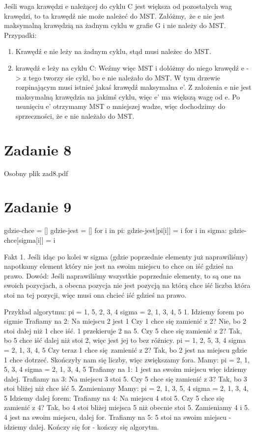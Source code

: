 \documentclass[12pt]{article}
\begin{document}
Jeśli waga krawędzi e należącej do cyklu C jest większa od pozostałych wag krawędzi, to ta krawędź nie może należeć do MST. Załóżmy, że e nie jest maksymalną krawędzią na żadnym cyklu w grafie G i nie należy do MST. Przypadki:
\begin{enumerate}
    \item Krawędź e nie leży na żadnym cyklu, stąd musi należec do MST.
    \item krawędź e leży na cyklu C: Weźmy więc MST i dołóżmy do niego krawędź e -> z tego tworzy sie cykl, bo e nie należało do MST. W tym drzewie rozpinającym musi istnieć jakaś krawędź maksymalna e'. Z założenia e nie jest maksymalną krawędzia na jakimś cyklu, więc e' ma większą wagę od e. Po usunięciu e' otrzymamy MST o mniejszej wadze, więc dochodzimy do sprzeczności, że e nie należało do MST.
\end{enumerate}
\section{Zadanie 8} 

Osobny plik zad8.pdf

\section{Zadanie 9}

gdzie-chce = []
gdzie-jest = []
for i in pi:
    gdzie-jest[pi[i]] = i
for i in sigma:
    gdzie-chce[sigma[i]] = i 


Fakt 1.
Jeśli idąc po kolei w sigma (gdzie poprzednie elementy już naprawiliśmy) napotkamy element który nie jest na swoim miejscu to chce on iść gdzieś na prawo.
Dowód:
Jeśli naprawiliśmy wszystkie poprzednie elementy, to są one na swoich pozycjach, a obecna pozycja nie jest pozycją na którą chce iść liczba która stoi na tej pozycji, więc musi ona chcieć iść gdzieś na prawo.

Przykład algorytmu:
pi = {1, 5, 2, 3, 4}
sigma = {2, 1, 3, 4, 5}
1. Idziemy forem po sigmie
Trafiamy na 2:
Na miejscu 2 jest 1 
Czy 1 chce się zamienić z 2? Nie, bo 2 stoi dalej niż 1 chce iść. 
1 przekieruje 2 na 5.
Czy 5 chce się zamienić z 2? Tak, bo 5 chce iść dalej niż stoi 2, więc jest jej to bez różnicy.
pi = {1, 2, 5, 3, 4}
sigma = {2, 1, 3, 4, 5}
Czy teraz 1 chce się zamienić z 2? Tak, bo 2 jest na miejscu gdzie 1 chce dotrzeć.
Skończyły nam się liczby, więc zwiększamy fora.
Mamy:
pi = {2, 1, 5, 3, 4}
sigma = {2, 1, 3, 4, 5}
Trafiamy na 1:
1 jest na swoim miejscu więc idziemy dalej.
Trafiamy na 3:
Na miejscu 3 stoi 5.
Czy 5 chce się zamienić z 3? Tak, bo 3 stoi bliżej niż chce iść 5.
Zamieniamy
Mamy:
pi = {2, 1, 3, 5, 4}
sigma = {2, 1, 3, 4, 5}
Idziemy dalej forem:
Trafiamy na 4:
Na miejscu 4 stoi 5.
Czy 5 chce się zamienić z 4?
Tak, bo 4 stoi bliżej miejsca 5 niż obecnie stoi 5.
Zamieniamy 4 i 5.
4 jest na swoim miejscu, dalej for.
Trafiamy na 5:
5 stoi na swoim miejscu - idziemy dalej.
Kończy się for - kończy się algorytm.
\end{document}
